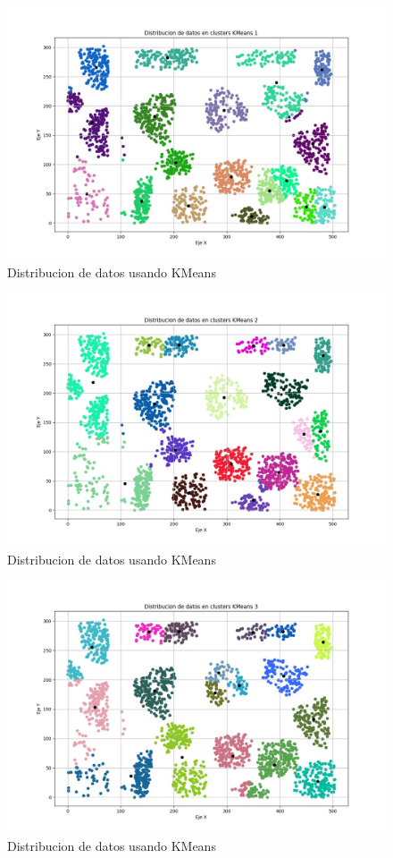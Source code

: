 \documentclass[conference]{IEEEtran}
\begin{document}
\begin{figure}[htbp]
    \centering
    \includegraphics[width=1\linewidth]{figures/kmeans1.jpeg} %
    \caption{Distribucion de datos usando KMeans}
    \label{fig:kmeans1}
\end{figure}
\begin{figure}[htbp]
    \centering
    \includegraphics[width=1\linewidth]{figures/kmeans2.jpeg} %
    \caption{Distribucion de datos usando KMeans}
    \label{fig:kmeans2}
\end{figure}
\begin{figure}[htbp]
    \centering
    \includegraphics[width=1\linewidth]{figures/kmeans3.jpeg} %
    \caption{Distribucion de datos usando KMeans}
    \label{fig:kmeans3}
\end{figure}
\end{document}
